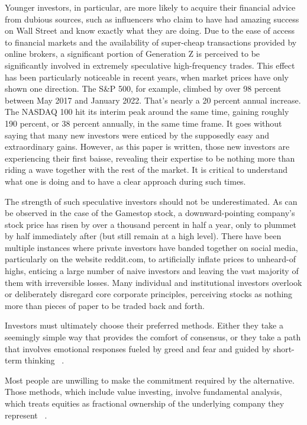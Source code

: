 \documentclass{imc-inf}
\begin{document}
Younger investors, in particular, are more likely to acquire their financial advice from dubious sources, such as influencers who claim to have had amazing success on Wall Street and know exactly what they are doing. Due to the ease of access to financial markets and the availability of super-cheap transactions provided by online brokers, a significant portion of Generation Z is perceived to be significantly involved in extremely speculative high-frequency trades. 
This effect has been particularly noticeable in recent years, when market prices have only shown one direction. The S\&P 500, for example, climbed by over 98 percent between May 2017 and January 2022. That's nearly a 20 percent annual increase. The NASDAQ 100 hit its interim peak around the same time, gaining roughly 190 percent, or 38 percent annually, in the same time frame. It goes without saying that many new investors were enticed by the supposedly easy and extraordinary gains.
However, as this paper is written, those new investors are experiencing their first baisse, revealing their expertise to be nothing more than riding a wave together with the rest of the market. It is critical to understand what one is doing and to have a clear approach during such times.

The strength of such speculative investors should not be underestimated. As can be observed in the case of the Gamestop stock, a downward-pointing company's stock price has risen by over a thousand percent in half a year, only to plummet by half immediately after (but still remain at a high level). There have been multiple instances where private investors have banded together on social media, particularly on the website reddit.com, to artificially inflate prices to unheard-of highs, enticing a large number of naive investors and leaving the vast majority of them with irreversible losses. Many individual and institutional investors overlook or deliberately disregard core corporate principles, perceiving stocks as nothing more than pieces of paper to be traded back and forth.

Investors must ultimately choose their preferred methods. Either they take a seemingly simple way that provides the comfort of consensus, or they take a path that involves emotional responses fueled by greed and fear and guided by short-term thinking ~\cite{margin_of_safety}.

Most people are unwilling to make the commitment required by the alternative. Those methods, which include value investing, involve fundamental analysis, which treats equities as fractional ownership of the underlying company they represent ~\cite{margin_of_safety}.
\end{document}
